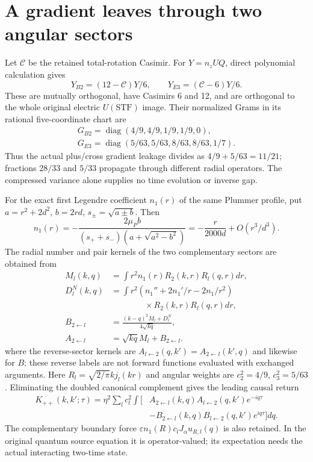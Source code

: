 \section{A gradient leaves through two angular sectors}
Let $\mathcal C$ be the retained total-rotation Casimir.  For
$Y=n_zUQ$, direct polynomial calculation gives
\[
 Y_{B2}=(12-\mathcal C)Y/6,\qquad
 Y_{E3}=(\mathcal C-6)Y/6.
\]
These are mutually orthogonal, have Casimirs 6 and 12, and are orthogonal
to the whole original electric $U(\mathrm{STF})$ image. Their normalized
Grams in its rational five-coordinate chart are
\[
 \begin{gathered}
 G_{B2}=\operatorname{diag}(4/9,4/9,1/9,1/9,0),\\
 G_{E3}=\operatorname{diag}(5/63,5/63,8/63,8/63,1/7).
 \end{gathered}
\]
Thus the actual plus/cross gradient leakage divides as $4/9+5/63=11/21$;
fractions $28/33$ and $5/33$ propagate through different radial operators.
The compressed variance alone supplies no time evolution or inverse gap.

For the exact first Legendre coefficient $n_1(r)$ of the same Plummer
profile, put $a=r^2+2d^2$, $b=2rd$, $s_\pm=\sqrt{a\pm b}$. Then
\[
 n_1(r)=-\frac{2\mu_P b}
 {(s_++s_-)(a+\sqrt{a^2-b^2})}
       =-\frac{r}{2000d}+O(r^3/d^3).
\]
The radial number and pair kernels of the two complementary sectors are
obtained from
\begin{align*}
 M_l(k,q)&=\int r^2n_1(r)R_2(k,r)R_l(q,r)dr,\\
 D_l^N(k,q)&=\int r^2(n_1''+2n_1'/r-2n_1/r^2)\\
 &\hspace{4em}\times R_2(k,r)R_l(q,r)dr,\\
 B_{2\leftarrow l}&=\frac{(k-q)^2M_l+D_l^N}{4\sqrt{kq}},\\
 A_{2\leftarrow l}&=\sqrt{kq}M_l+B_{2\leftarrow l}.
\end{align*}
where the reverse-sector kernels are $A_{l\leftarrow2}(q,k\prime)=A_{2\leftarrow l}(k\prime,q)$ and likewise for $B$; these reverse labels are not forward functions evaluated with exchanged arguments. Here $R_l=\sqrt{2/\pi}k j_l(kr)$ and angular weights are $c_2^2=4/9$,
$c_3^2=5/63$.  Eliminating the doubled canonical complement gives the
leading causal return
\[
 \begin{aligned}
 K_{++}(k,k';\tau)=\eta^2\sum_lc_l^2\int
 \big[&A_{2\leftarrow l}(k,q)A_{l\leftarrow2}(q,k')e^{-iq\tau}\\
       &-B_{2\leftarrow l}(k,q)B_{l\leftarrow2}(q,k')e^{iq\tau}\big]dq.
 \end{aligned}
\]
The complementary boundary force
$\varepsilon n_1(R)c_lJ_\alpha u_{R,l}(q)$ is also retained.  In the
original quantum source equation it is operator-valued; its expectation
needs the actual interacting two-time state.

